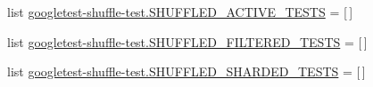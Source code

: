 \begin{DoxyCompactItemize}
\item 
list \mbox{\hyperlink{namespacegoogletest-shuffle-test_ace88109d48e71fb142bd212d676ea039}{googletest-\/shuffle-\/test.\+S\+H\+U\+F\+F\+L\+E\+D\+\_\+\+A\+C\+T\+I\+V\+E\+\_\+\+T\+E\+S\+TS}} = \mbox{[}$\,$\mbox{]}
\item 
list \mbox{\hyperlink{namespacegoogletest-shuffle-test_a40b3d44626a2600f58f70bfd8362c779}{googletest-\/shuffle-\/test.\+S\+H\+U\+F\+F\+L\+E\+D\+\_\+\+F\+I\+L\+T\+E\+R\+E\+D\+\_\+\+T\+E\+S\+TS}} = \mbox{[}$\,$\mbox{]}
\item 
list \mbox{\hyperlink{namespacegoogletest-shuffle-test_ae1b92f7d58889a71c042a206d6659da9}{googletest-\/shuffle-\/test.\+S\+H\+U\+F\+F\+L\+E\+D\+\_\+\+S\+H\+A\+R\+D\+E\+D\+\_\+\+T\+E\+S\+TS}} = \mbox{[}$\,$\mbox{]}
\end{DoxyCompactItemize}
